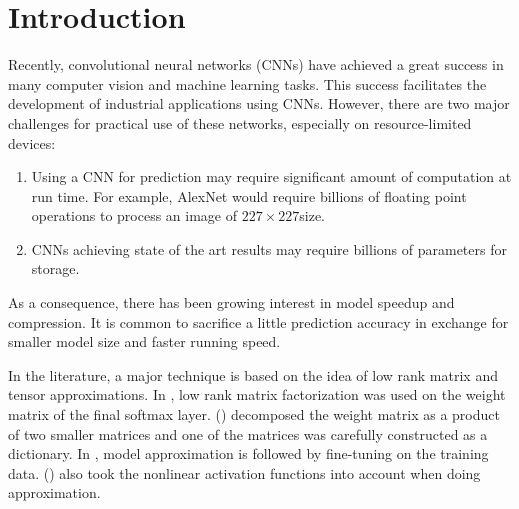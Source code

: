 \documentclass{article}
\begin{document}
\section{Introduction}
Recently, convolutional neural networks (CNNs) have achieved a great success in many computer vision and machine learning tasks. This success facilitates the development of industrial applications using CNNs. However, there are two major challenges for practical use of these networks, especially on resource-limited devices:
\begin{enumerate}
\item Using a CNN for prediction may require significant amount of computation at run time. For example, AlexNet\cite{krizhevsky2012imagenet} would
  require billions of floating point operations to process an image of $227\times 227 $size.
\item CNNs achieving state of the art results may require billions \cite{dean2012large,le2013building,Jaderberg14c} of parameters for storage.
\end{enumerate}
As a consequence, there has been growing interest in model speedup and compression. It is common to sacrifice a little prediction accuracy in exchange
for smaller model size and faster running speed.

In the literature, a major technique is based on the idea of low rank matrix and tensor approximations.
In \cite{sainath2013low}, low rank matrix factorization was used on the weight matrix of the final softmax layer. \citeauthor{denil2013predicting} (\citeyear{denil2013predicting}) decomposed the weight matrix as a product of two smaller matrices and one of the matrices was carefully constructed as a dictionary. In \cite{xue2013restructuring,denton2014exploiting}, model approximation is followed by fine-tuning on the training data. \citeauthor{zhang2015accelerating} (\citeyear{zhang2015accelerating}) also took the nonlinear activation functions into account when doing approximation.
\end{document}
